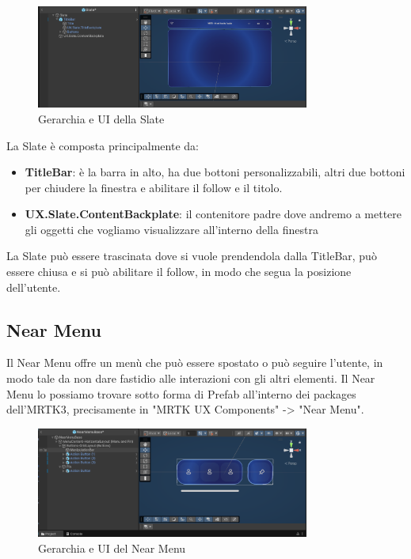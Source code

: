 \begin{figure}[H]
    \centering
    \includegraphics[width=0.8\textwidth,height=\textheight,keepaspectratio]{figures/chapter_1/slate.png}
    \caption{Gerarchia e UI della Slate}
\end{figure}

La Slate è composta principalmente da:
\begin{itemize}
    \item \textbf{TitleBar}: è la barra in alto, ha due bottoni personalizzabili, altri due bottoni per chiudere la finestra e abilitare il follow e il titolo.
    \item \textbf{UX.Slate.ContentBackplate}: il contenitore padre dove andremo a mettere gli oggetti che vogliamo visualizzare all'interno della finestra
\end{itemize}

La Slate può essere trascinata dove si vuole prendendola dalla TitleBar, può essere chiusa e si può abilitare il follow, in modo che segua la posizione dell'utente.
\cite{MRTKslate}

\subsection{Near Menu}
Il Near Menu offre un menù che può essere spostato o può seguire l'utente, in modo tale da non dare fastidio alle interazioni con gli altri elementi. Il Near Menu lo possiamo trovare sotto forma di Prefab all'interno dei packages dell'MRTK3, precisamente in "MRTK UX Components" -> "Near Menu".

\begin{figure}[H]
    \centering
    \includegraphics[width=0.8\textwidth,height=\textheight,keepaspectratio]{figures/chapter_1/nearMenu.png}
    \caption{Gerarchia e UI del Near Menu}
\end{figure}

